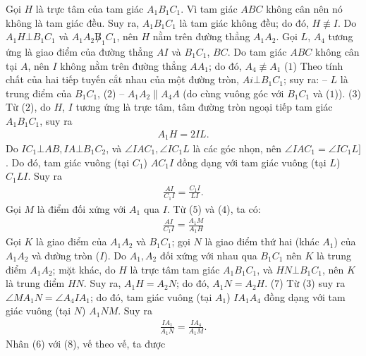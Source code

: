 \begin{multicols}{2}
\begin{figure}[H]
		\vspace*{-15pt}
	\end{figure}
	Gọi $H$ là trực tâm của tam giác $A_1B_1C_1$.
	\vskip 0.05cm 
	Vì tam giác $ABC$ không cân nên nó không là tam giác đều. Suy ra, $A_1B_1C_1$  là tam giác không đều; do đó,  $H \not\equiv I$.
	\vskip 0.05cm
	Do $A_1H \bot B_1C_1$  và  $A_1A_2 \not B_1C_1$, nên $H$ nằm trên đường thẳng  $A_1A_2$.
	\vskip 0.05cm
	Gọi $L$, $A_4$  tương ứng là giao điểm của đường thẳng $AI$ và  $B_1C_1$, $BC$.
	\vskip 0.05cm
	Do tam giác $ABC$ không cân tại $A$, nên $I$ không nằm trên đường thẳng $AA_1$; do đó, $A_4 \not\equiv A_1$    \hfill ($1$)
	\vskip 0.05cm 
	Theo tính chất của hai tiếp tuyến cắt nhau của một đường tròn,  $Ai \bot B_1C_1$; suy ra:
	\vskip 0.05cm
	-- $L$ là trung điểm của $B_1C_1$, \hfill ($2$)
	\vskip 0.05cm
	-- $A_1A_2 \parallel A_4A$  (do cùng vuông góc với  $B_1C_1$ và ($1$)). \hfill($3$)
	\vskip 0.05cm
	Từ ($2$), do $H$, $I$ tương ứng là trực tâm, tâm đường tròn ngoại tiếp tam giác  $A_1B_1C_1$, suy ra
	\begin{align*}
		A_1H = 2IL. \tag{$4$}
	\end{align*}
	Do  $IC_1 \bot AB, IA \bot B_1C_2$, và  $\angle IAC_1, \angle IC_1L$ là các góc nhọn, nên $\angle IAC_1 = \angle IC_1L]$. Do đó, tam giác vuông (tại  $C_1$) $AC_1I$   đồng dạng với tam giác vuông (tại $L$) $C_1LI$.  Suy ra
	\begin{align*}
		\frac{{AI}}{{{C_1}I}} = \frac{{{C_1}I}}{{LI}}.\tag{$5$}
	\end{align*}
	Gọi $M$ là điểm đối xứng với $A_1$  qua $I$. Từ ($5$) và ($4$), ta có:
	\begin{align*}
		\frac{{AI}}{{{C_1}I}} = \frac{{{A_1}M}}{{{A_1}H}} \tag{$6$}
	\end{align*}
	Gọi $K$ là giao điểm của $A_1A_2$ và  $B_1C_1$; gọi $N$ là giao điểm thứ hai (khác $A_1$) của  $A_1A_2$ và đường tròn ($I$).
	\vskip 0.05cm
	Do $A_1, A_2$  đối xứng với nhau qua  $B_1C_1$ nên $K$ là trung điểm $A_1A_2$;  mặt khác, do $H$ là trực tâm tam giác $A_1B_1C_1$, và  $HN \bot B_1C_1$, nên $K$ là trung điểm $HN$. Suy ra, $A_1H = A_2N$; do đó, $A_1N = A_2H$. \hfill  ($7$)
	\vskip 0.05cm
	Từ ($3$) suy ra  $\angle MA_1N = \angle A_4IA_1$; do đó, tam giác vuông (tại  $A_1$) $IA_1A_4$ đồng dạng với tam giác vuông (tại $N$) $A_1NM$.  Suy ra
	\begin{align*}
		\frac{{I{A_1}}}{{{A_1}N}} = \frac{{I{A_4}}}{{{A_1}M}}. \tag{$8$}
	\end{align*}
	Nhân ($6$) với ($8$), vế theo vế, ta được
	\begin{align*}

\end{align*}
\end{multicols}
